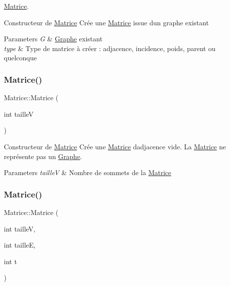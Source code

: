 \hyperlink{classMatrice}{Matrice}. 

Constructeur de \hyperlink{classMatrice}{Matrice} Cr\'{e}e une \hyperlink{classMatrice}{Matrice} issue d\textquotesingle{}un graphe existant 
\begin{DoxyParams}{Parameters}
{\em G} & \hyperlink{classGraphe}{Graphe} existant \\
\hline
{\em type} & Type de matrice \`{a} cr\'{e}er \+: adjacence, incidence, poids, parent ou quelconque \\
\hline
\end{DoxyParams}
\mbox{\label{classMatrice_a96e99274a8460529db8ee4076247c802}} 
\subsubsection{\texorpdfstring{Matrice()}{Matrice()}\hspace{0.1cm}{\footnotesize\ttfamily [2/4]}}
{\footnotesize\ttfamily Matrice\+::\+Matrice (\begin{DoxyParamCaption}\item[{int}]{tailleV }\end{DoxyParamCaption})}



Constructeur de \hyperlink{classMatrice}{Matrice} Cr\'{e}e une \hyperlink{classMatrice}{Matrice} d\textquotesingle{}adjacence vide. La \hyperlink{classMatrice}{Matrice} ne représente pas un \hyperlink{classGraphe}{Graphe}. 


\begin{DoxyParams}{Parameters}
{\em tailleV} & Nombre de sommets de la \hyperlink{classMatrice}{Matrice} \\
\hline
\end{DoxyParams}
\mbox{\label{classMatrice_a30e71086a1d43bc3604188aaa6a3ac1c}} 
\subsubsection{\texorpdfstring{Matrice()}{Matrice()}\hspace{0.1cm}{\footnotesize\ttfamily [3/4]}}
{\footnotesize\ttfamily Matrice\+::\+Matrice (\begin{DoxyParamCaption}\item[{int}]{tailleV,  }\item[{int}]{tailleE,  }\item[{int}]{t }\end{DoxyParamCaption})}



